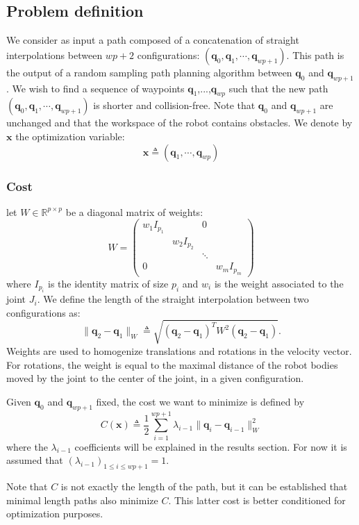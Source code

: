 \documentclass{tADR2e}
\newcommand\real{\mathbb{R}}
\newcommand\conf{\mathbf{q}}
\newcommand\xx{\mathbf{x}} %
\newcommand\cost{C}
\begin{document}
\subsection{Problem definition}

We consider as input a path composed of a concatenation of straight 
interpolations between $wp+2$ configurations: $(\conf_0, \conf_1,\cdots,\conf_{wp
+1})$. This path is the output of a random sampling path planning algorithm 
between $\conf_0$ and $\conf_{wp+1}$. We wish to find a sequence of waypoints $
\conf_{1}$,...,$\conf_{wp}$ such that the new path $(\conf_0, \conf_1,\cdots,
\conf_{wp+1})$ is shorter and collision-free. Note that $\conf_0$ and $\conf_{wp
+1}$ are unchanged and that the workspace of the robot contains obstacles. We 
denote by $\xx$ the optimization variable:
$$
\xx \triangleq (\conf_1,\cdots,\conf_{wp})
$$

\subsubsection{Cost}

let $W\in\real^{p\times p}$ be a diagonal matrix of weights:
$$
W=\left(\begin{array}{cccccccccc}
w_1 I_{p_1}       &        &  0  \\
    & w_2 I_{p_2} &        &   \\
    &            & \ddots &   \\
  0 &            &        & w_m I_{p_m}
\end{array}\right)
$$
where $I_{p_i}$ is the identity matrix of size $p_i$ and $w_i$ is the weight 
associated to the joint $J_i$. We define the length of the straight interpolation 
between two configurations as:
$$
\|\conf_2 - \conf_1\|_{W} \triangleq \sqrt{(\conf_2 - \conf_1)^T W^2 (\conf_2 - 
\conf_1)}.
$$
Weights are used to homogenize translations and rotations in the velocity vector. 
For rotations, the weight is equal to the maximal distance of the robot bodies 
moved by the joint to the center of the joint, in a given configuration.

Given $\conf_0$ and $\conf_{wp+1}$ fixed, the cost we want to minimize is defined 
by
$$
\cost (\xx) \triangleq \frac{1}{2}\sum_{i=1}^{wp+1} \lambda_{i-1} \|\conf_{i}-\conf_{i-1}\|_{W}
^{2}
$$
where the $\lambda_{i-1}$ coefficients will be explained in the results 
section. For now it is assumed that $(\lambda_{i-1})_{1\leq i\leq wp+1}=1$.

Note that $\cost$ is not exactly the length of the path, but it can be 
established that minimal length paths also minimize $\cost$. This latter cost is 
better conditioned for optimization purposes.
\end{document}
